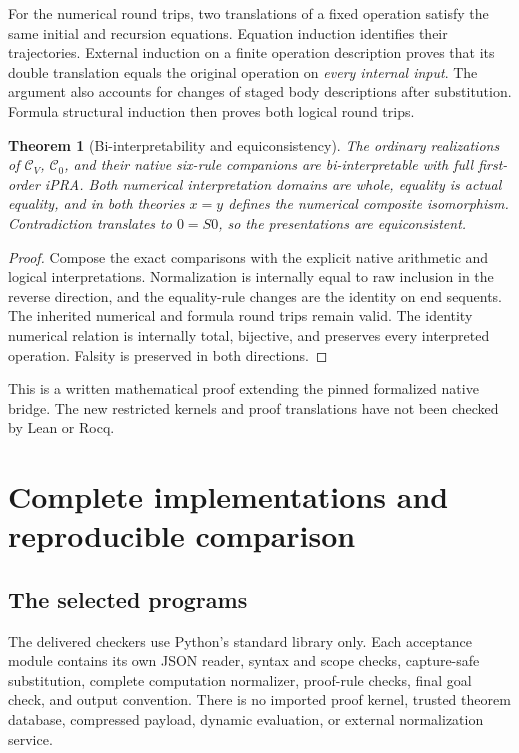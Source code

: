 \documentclass[11pt]{article}
\newtheorem{theorem}{Theorem}[section]
\theoremstyle{definition}
\theoremstyle{remark}
\newcommand{\CV}{\mathcal C_V}
\newcommand{\CZ}{\mathcal C_0}
\begin{document}
For the numerical round trips, two translations of a fixed operation
satisfy the same initial and recursion equations. Equation induction
identifies their trajectories. External induction on a finite operation
description proves that its double translation equals the original
operation on \emph{every internal input}. The argument also accounts for
changes of staged body descriptions after substitution.
Formula structural induction then proves both logical round trips.

\begin{theorem}[Bi-interpretability and equiconsistency]
The ordinary realizations of $\CV$, $\CZ$, and their native six-rule
companions are bi-interpretable with full first-order iPRA.
Both numerical interpretation domains are whole, equality is actual
equality, and in both theories $x=y$ defines the numerical composite
isomorphism. Contradiction translates to $0=S0$, so the presentations
are equiconsistent.
\end{theorem}
\begin{proof}
Compose the exact comparisons with the explicit native arithmetic and
logical interpretations. Normalization is internally equal to raw
inclusion in the reverse direction, and the equality-rule changes are
the identity on end sequents. The inherited numerical and formula
round trips remain valid. The identity numerical relation is internally
total, bijective, and preserves every interpreted operation.
Falsity is preserved in both directions.
\end{proof}

This is a written mathematical proof extending the pinned formalized native
bridge. The new restricted kernels and proof translations have not been
checked by Lean or Rocq.


\section{Complete implementations and reproducible comparison}
\label{sec:implementation}

\subsection{The selected programs}

The delivered checkers use Python's standard library only. Each acceptance
module contains its own JSON reader, syntax and scope checks, capture-safe
substitution, complete computation normalizer, proof-rule checks, final
goal check, and output convention. There is no imported proof kernel,
trusted theorem database, compressed payload, dynamic evaluation, or
external normalization service.
\end{document}
